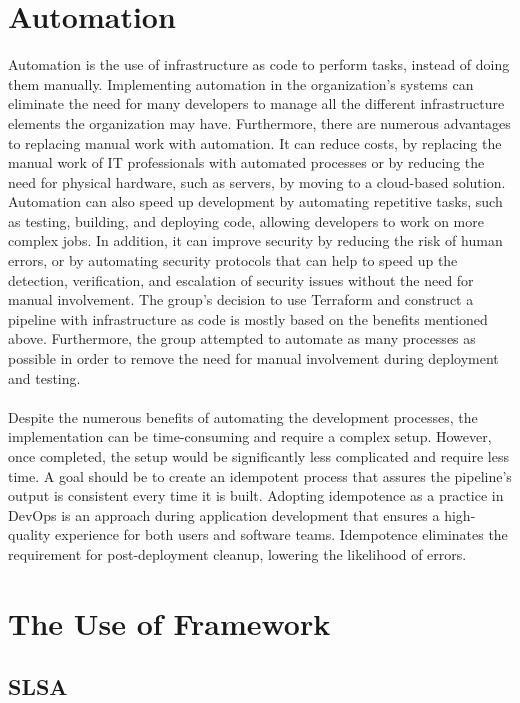 \section{Automation}
Automation is the use of \gls{infrastructure as code} to perform tasks, instead of doing them manually. Implementing automation in the organization's systems can eliminate the need for many developers to manage all the different infrastructure elements the organization may have. Furthermore, there are numerous advantages to replacing manual work with automation. It can reduce costs, by replacing the manual work of IT professionals with automated processes or by reducing the need for physical hardware, such as servers, by moving to a cloud-based solution. Automation can also speed up development by automating repetitive tasks, such as testing, building, and deploying code, allowing developers to work on more complex jobs. In addition, it can improve security by reducing the risk of human errors, or by automating security protocols that can help to speed up the detection, verification, and escalation of security issues without the need for manual involvement. The group's decision to use Terraform and construct a pipeline with \gls{infrastructure as code} is mostly based on the benefits mentioned above. Furthermore, the group attempted to automate as many processes as possible in order to remove the need for manual involvement during deployment and testing. \cite{automation} \cite{automationredhat}
\\~\\
Despite the numerous benefits of automating the development processes, the implementation can be time-consuming and require a complex setup. However, once completed, the setup would be significantly less complicated and require less time. A goal should be to create an idempotent process that assures the pipeline's output is consistent every time it is built. Adopting idempotence as a practice in DevOps is an approach during application development that ensures a high-quality experience for both users and software teams. Idempotence eliminates the requirement for post-deployment cleanup, lowering the likelihood of errors. \cite{idempotent}

\section{The Use of Framework}
\subsection{SLSA}

